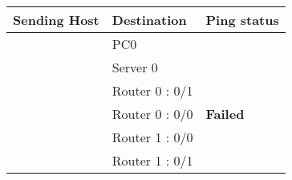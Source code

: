 \documentclass[a4paper,11pt]{article}
\begin{document}
\begin{enumerate}
          \begin{table}[H]
              \centering
              \begin{tabular}{| m{9em}| m{12em}| m{9em} |}
                  \hline
                  {\cellcolor[rgb]{0.333,0.686,1}}\textbf{Sending Host}           & \textbf{Destination} & \multicolumn{1}{l|}{\textbf{Ping status}}                                             \\
                  \hline
                  {\cellcolor[rgb]{0.333,0.686,1}}                                & PC0                  & \multicolumn{1}{l|}{{\cellcolor[rgb]{1,0.173,0.09}}}                                  \\
                  \hhline{|>{\arrayrulecolor[rgb]{0.333,0.686,1}}->{\arrayrulecolor{black}}->{\arrayrulecolor[rgb]{1,0.173,0.09}}->{\arrayrulecolor{black}}|}
                  {\cellcolor[rgb]{0.333,0.686,1}}                                & Server 0             & \multicolumn{1}{l|}{{\cellcolor[rgb]{1,0.173,0.09}}}                                  \\
                  \hhline{|>{\arrayrulecolor[rgb]{0.333,0.686,1}}->{\arrayrulecolor{black}}->{\arrayrulecolor[rgb]{1,0.173,0.09}}->{\arrayrulecolor{black}}|}
                  {\cellcolor[rgb]{0.333,0.686,1}}                                & Router 0 : 0/1       & \multicolumn{1}{l|}{{\cellcolor[rgb]{1,0.173,0.09}}}                                  \\
                  \hhline{|>{\arrayrulecolor[rgb]{0.333,0.686,1}}->{\arrayrulecolor{black}}->{\arrayrulecolor[rgb]{1,0.173,0.09}}->{\arrayrulecolor{black}}|}
                  {\cellcolor[rgb]{0.333,0.686,1}}                                & Router 0 : 0/0       & \multicolumn{1}{l|}{\multirow{-4}{*}{{\cellcolor[rgb]{1,0.173,0.09}}\textbf{Failed}}} \\
                  \hhline{|>{\arrayrulecolor[rgb]{0.333,0.686,1}}->{\arrayrulecolor{black}}--}
                  {\cellcolor[rgb]{0.333,0.686,1}}                                & Router 1 : 0/0       & {\cellcolor[rgb]{0.376,1,0.882}}                                                      \\
                  \hhline{|>{\arrayrulecolor[rgb]{0.333,0.686,1}}->{\arrayrulecolor{black}}->{\arrayrulecolor[rgb]{0.376,1,0.882}}-}
                  {\cellcolor[rgb]{0.333,0.686,1}}                                & Router 1 : 0/1       & {\cellcolor[rgb]{0.376,1,0.882}}                                                      \\

\end{tabular}
\end{table}
\end{enumerate}
\end{document}
